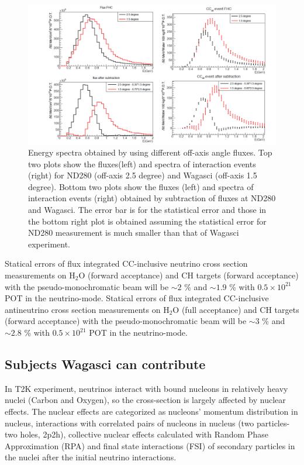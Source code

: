 \begin{figure}[tbh]
\begin{center}
\includegraphics[width=\textwidth]{fig/fluxsubtractFHC.pdf}
\end{center}
\caption{Energy spectra obtained by using different off-axis angle fluxes.
  Top two plots show the fluxes(left) and spectra of interaction events (right) for ND280 (off-axis 2.5 degree) and Wagasci (off-axis 1.5 degree). Bottom two plots show the fluxes (left) and spectra of interaction events (right) obtained by
  subtraction of fluxes at ND280 and Wagasci.
  The error bar is for the statistical error and those in the bottom right plot is obtained assuming the statistical error
  for ND280 measurement is much smaller than that of Wagasci experiment.
}
\label{fig:fluxsubtfhc}
\end{figure}


Statical errors of flux integrated CC-inclusive neutrino cross section measurements on H$_{2}$O (forward acceptance) and CH targets (forward acceptance) with the pseudo-monochromatic beam
will be $\sim 2$ \% and $\sim 1.9$ \% with $0.5\times 10^{21}$ POT in the neutrino-mode.
Statical errors of flux integrated CC-inclusive antineutrino cross section measurements on H$_{2}$O (full acceptance) and CH targets (forward acceptance) with the pseudo-monochromatic beam
will be $\sim 3$ \% and $\sim 2.8$ \% with $0.5\times 10^{21}$ POT in the neutrino-mode.


\subsection{Subjects Wagasci can contribute}
In T2K experiment, neutrinos interact with bound nucleons in relatively heavy nuclei (Carbon and Oxygen), so the cross-section is largely affected by nuclear effects.
The nuclear effects are categorized as nucleons' momentum distribution in nucleus, interactions with  correlated pairs of nucleons in nucleus (two particles-two holes, 2p2h), collective nuclear effects calculated with Random Phase Approximation (RPA) and final state interactions (FSI) of secondary particles in the nuclei after the initial neutrino interactions.


